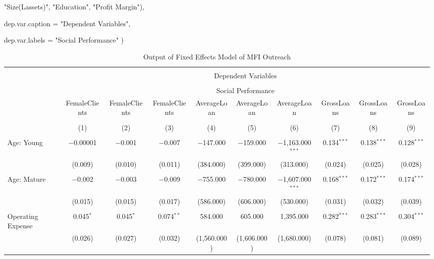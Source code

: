 \documentclass[a4paper,nobind]{templates/ociamthesis}
\newenvironment{Shaded}{\begin{snugshade}}{\end{snugshade}}
\newcommand{\AttributeTok}[1]{\textcolor[rgb]{0.77,0.63,0.00}{#1}}
\newcommand{\NormalTok}[1]{#1}
\newcommand{\StringTok}[1]{\textcolor[rgb]{0.31,0.60,0.02}{#1}}
\renewenvironment{Shaded}
{
  \vspace{10pt}%
  \begin{snugshade}%
}{%
  \end{snugshade}%
  \vspace{8pt}%
}
\begin{document}
\begin{landscape}
\begin{Shaded}
\begin{Highlighting}[]
                     \StringTok{"Size(Lassets)"}\NormalTok{, }\StringTok{"Education"}\NormalTok{, }\StringTok{"Profit Margin"}\NormalTok{), }

\AttributeTok{dep.var.caption  =} \StringTok{"Dependent Variables"}\NormalTok{,}

  \AttributeTok{dep.var.labels   =} \StringTok{"Social Performance"}
\NormalTok{)}
\end{Highlighting}
\end{Shaded}

\begin{table}[!htbp] \centering 
  \caption{Output of Fixed Effects Model of MFI Outreach} 
  \label{} 
\footnotesize 
\begin{tabular}{@{\extracolsep{5pt}}lccccccccc} 
\\[-1.8ex]\hline 
\hline \\[-1.8ex] 
 & \multicolumn{9}{c}{Dependent Variables} \\ 
\cline{2-10} 
\\[-1.8ex] & \multicolumn{9}{c}{Social Performance} \\ 
 & FemaleClients & FemaleClients & FemaleClients & AverageLoan & AverageLoan & AverageLoan & GrossLoans & GrossLoans & GrossLoans \\ 
\\[-1.8ex] & (1) & (2) & (3) & (4) & (5) & (6) & (7) & (8) & (9)\\ 
\hline \\[-1.8ex] 
 Age: Young & $-$0.00001 & $-$0.001 & $-$0.007 & $-$147.000 & $-$159.000 & $-$1,163.000$^{***}$ & 0.134$^{***}$ & 0.138$^{***}$ & 0.128$^{***}$ \\ 
  & (0.009) & (0.010) & (0.011) & (384.000) & (399.000) & (313.000) & (0.024) & (0.025) & (0.028) \\ 
  & & & & & & & & & \\ 
 Age: Mature & $-$0.002 & $-$0.003 & $-$0.009 & $-$755.000 & $-$780.000 & $-$1,607.000$^{***}$ & 0.168$^{***}$ & 0.172$^{***}$ & 0.174$^{***}$ \\ 
  & (0.015) & (0.015) & (0.017) & (586.000) & (606.000) & (530.000) & (0.031) & (0.032) & (0.039) \\ 
  & & & & & & & & & \\ 
 Operating Expense & 0.045$^{*}$ & 0.045$^{*}$ & 0.074$^{**}$ & 584.000 & 605.000 & 1,395.000 & 0.282$^{***}$ & 0.283$^{***}$ & 0.304$^{***}$ \\ 
  & (0.026) & (0.027) & (0.032) & (1,560.000) & (1,606.000) & (1,680.000) & (0.078) & (0.081) & (0.089) \\ 

\end{tabular}
\end{table}
\end{landscape}
\end{document}
